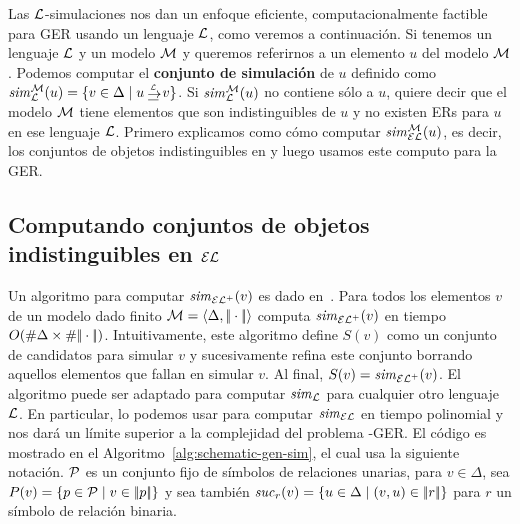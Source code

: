 Las $\mathcal{L}$-simulaciones nos dan un enfoque eficiente, computacionalmente factible para GER usando un lenguaje $\mathcal{L}$, como veremos a continuaci\'on. Si tenemos un lenguaje $\mathcal{L}$ y un modelo $\mathcal{M}$ y queremos referirnos a un elemento $u$ del modelo $\mathcal{M}$. Podemos computar el {\bf conjunto de simulaci\'on} de $u$ definido como
$\simset_{\+L}^{\+M}(u) = \cset{v \in \Delta \mid u \simul{\+L} v}$. Si ${\it sim}_{\mathcal{L}}^{\mathcal{M}}(u)$ no contiene s\'olo a $u$, quiere decir que el modelo $\mathcal{M}$ tiene elementos que son indistinguibles de $u$ y no existen ERs para $u$ en ese lenguaje $\mathcal{L}$.
Primero explicamos como c\'omo computar ${\it sim}_{\mathcal{EL}}^{\mathcal{M}}(u)$, es decir, los conjuntos de objetos indistinguibles en \EL y luego usamos este computo para la GER.
%

\subsection{Computando conjuntos de objetos indistinguibles en $\mathcal{EL}$}

Un algoritmo para computar ${\it sim}_{{\mathcal{EL}^+}}(v)$ es dado en~\cite{HHK95}. Para todos los
elementos $v$ de un modelo dado finito
$\mathcal{M}=\langle \Delta,|\!|\cdot|\!| \rangle$
computa ${\it sim}_{{\mathcal{EL}^+}}(v)$ en tiempo $O(\# \Delta\times\# {|\!|\cdot|\!|})$.
Intuitivamente, este algoritmo
define $S(v)$ como un conjunto de candidatos para simular $v$ y
sucesivamente refina este conjunto borrando aquellos elementos que fallan en simular $v$.
Al final, $S(v)={\it sim}_{\mathcal{EL}^+}(v)$. El algoritmo puede ser adaptado para
computar ${\it sim}_{\mathcal{L}}$ para cualquier otro lenguaje $\mathcal{L}$. En particular,
lo podemos usar para computar ${\it sim}_\mathcal{EL}$ en tiempo polinomial y nos dar\'a un l\'imite superior a la
complejidad del problema \EL-GER. 
El c\'odigo es mostrado en el
Algoritmo~\ref{alg:schematic-gen-sim}, el cual usa la siguiente
notaci\'on. $\mathcal{P}$ es un conjunto fijo de s\'imbolos de relaciones unarias, para $v\in
\Delta$, sea $P(v)=\{p\in\mathcal{P}\mid v\in|\!|p|\!|\}$ y sea tambi\'en
${\it suc}_{r}(v)=\{u\in\Delta\mid(v,u)\in|\!|r|\!|\}$ para $r$ un s\'imbolo de relaci\'on binaria.\\


